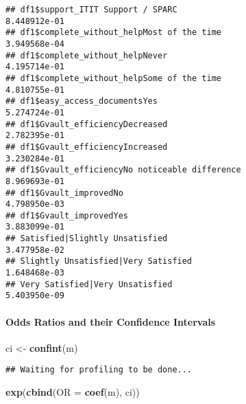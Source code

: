 \documentclass[]{article}
\newenvironment{Shaded}{\begin{snugshade}}{\end{snugshade}}
\newcommand{\KeywordTok}[1]{\textcolor[rgb]{0.13,0.29,0.53}{\textbf{#1}}}
\newcommand{\DataTypeTok}[1]{\textcolor[rgb]{0.13,0.29,0.53}{#1}}
\newcommand{\StringTok}[1]{\textcolor[rgb]{0.31,0.60,0.02}{#1}}
\newcommand{\NormalTok}[1]{#1}
\let\oldparagraph\paragraph
\renewcommand{\paragraph}[1]{\oldparagraph{#1}\mbox{}}
\begin{document}
\begin{verbatim}
## df1$support_ITIT Support / SPARC                                                             8.448912e-01
## df1$complete_without_helpMost of the time                                                    3.949568e-04
## df1$complete_without_helpNever                                                               4.195714e-01
## df1$complete_without_helpSome of the time                                                    4.810755e-01
## df1$easy_access_documentsYes                                                                 5.274724e-01
## df1$Gvault_efficiencyDecreased                                                               2.782395e-01
## df1$Gvault_efficiencyIncreased                                                               3.230284e-01
## df1$Gvault_efficiencyNo noticeable difference                                                8.969693e-01
## df1$Gvault_improvedNo                                                                        4.798950e-03
## df1$Gvault_improvedYes                                                                       3.883099e-01
## Satisfied|Slightly Unsatisfied                                                               3.477958e-02
## Slightly Unsatisfied|Very Satisfied                                                          1.648468e-03
## Very Satisfied|Very Unsatisfied                                                              5.403950e-09
\end{verbatim}

\paragraph{Odds Ratios and their Confidence
Intervals}\label{odds-ratios-and-their-confidence-intervals}

\begin{Shaded}
\begin{Highlighting}[]
\NormalTok{ci <-}\StringTok{ }\KeywordTok{confint}\NormalTok{(m)}
\end{Highlighting}
\end{Shaded}

\begin{verbatim}
## Waiting for profiling to be done...
\end{verbatim}

\begin{Shaded}
\begin{Highlighting}[]
\KeywordTok{exp}\NormalTok{(}\KeywordTok{cbind}\NormalTok{(}\DataTypeTok{OR =} \KeywordTok{coef}\NormalTok{(m), ci))}
\end{Highlighting}
\end{Shaded}
\end{document}

